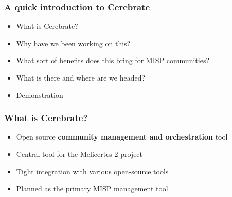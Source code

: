 
\begin{frame}[t,plain]
\titlepage
\end{frame}

\begin{frame}
	\frametitle{A quick introduction to Cerebrate}
	\begin{itemize}
		\item What is Cerebrate?
                \item Why have we been working on this?
                \item What sort of benefits does this bring for MISP communities?
                \item What is there and where are we headed?
                \item Demonstration
	\end{itemize}
\end{frame}

\begin{frame}
	\frametitle{What is Cerebrate?}
	\begin{itemize}
                \item Open source {\bf community management and orchestration} tool
                \item Central tool for the Melicertes 2 project
                \item Tight integration with various open-source tools
                \item Planned as the primary MISP management tool
	\end{itemize}
\end{frame}

